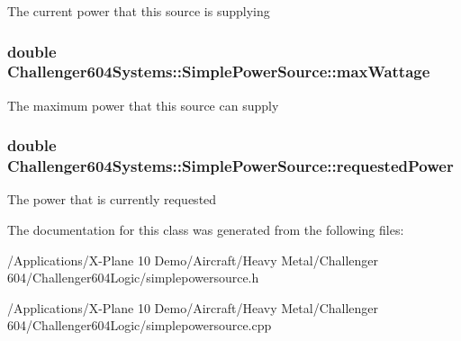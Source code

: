 The current power that this source is supplying \hypertarget{class_challenger604_systems_1_1_simple_power_source_a5fb4dd72e0d2a30293f91e9be9eb6e97}{
\subsubsection[{max\-Wattage}]{\setlength{\rightskip}{0pt plus 5cm}double Challenger604\-Systems\-::\-Simple\-Power\-Source\-::max\-Wattage\hspace{0.3cm}{\ttfamily [protected]}}}\label{class_challenger604_systems_1_1_simple_power_source_a5fb4dd72e0d2a30293f91e9be9eb6e97}
The maximum power that this source can supply \hypertarget{class_challenger604_systems_1_1_simple_power_source_af9ee729a686825c87e59c55622b64659}{
\subsubsection[{requested\-Power}]{\setlength{\rightskip}{0pt plus 5cm}double Challenger604\-Systems\-::\-Simple\-Power\-Source\-::requested\-Power\hspace{0.3cm}{\ttfamily [protected]}}}\label{class_challenger604_systems_1_1_simple_power_source_af9ee729a686825c87e59c55622b64659}
The power that is currently requested 

The documentation for this class was generated from the following files\-:\begin{DoxyCompactItemize}
\item 
/\-Applications/\-X-\/\-Plane 10 Demo/\-Aircraft/\-Heavy Metal/\-Challenger 604/\-Challenger604\-Logic/simplepowersource.\-h\item 
/\-Applications/\-X-\/\-Plane 10 Demo/\-Aircraft/\-Heavy Metal/\-Challenger 604/\-Challenger604\-Logic/simplepowersource.\-cpp\end{DoxyCompactItemize}
